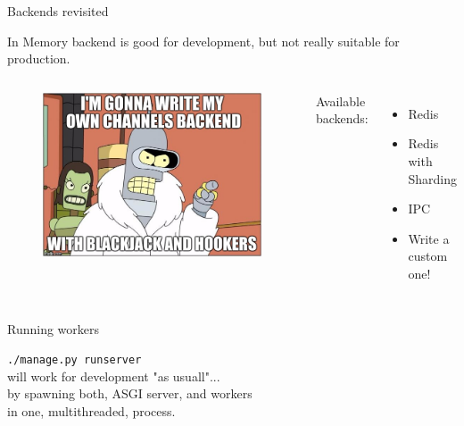 \documentclass{beamer}
\begin{document}
\begin{frame}{Backends revisited}
\begin{adjustwidth}{2em}{2.5em}
	In Memory backend is good for development, but not really suitable for production.
	
\vspace{1em}

\begin{columns}
\begin{figure}
	\includegraphics[scale=0.21]{own_backend.jpg}
\end{figure}
Available backends:
	\begin{itemize}
		\item Redis
		\item Redis with Sharding
		\item IPC
		\item Write a custom one!
	\end{itemize}
\end{columns}

\end{adjustwidth}
\end{frame}

\begin{frame}[fragile]{Running workers}
	\begin{center}
		\texttt{./manage.py runserver}\\
		will work for development "as usuall"...\\
		\pause
		\vspace{1em}
		by spawning both, ASGI server, and workers\\
		in one, multithreaded, process.\\
	\end{center}
\end{frame}
\end{document}
